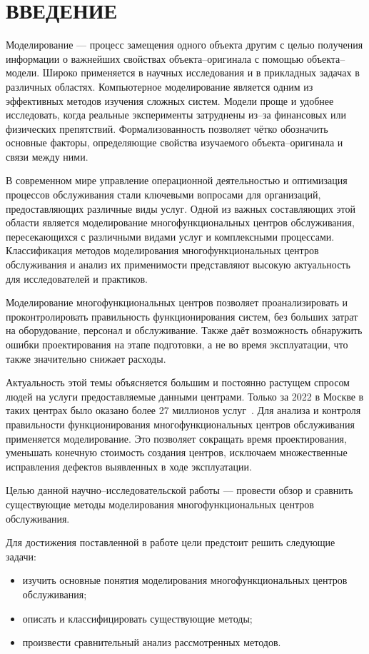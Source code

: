 \chapter*{ВВЕДЕНИЕ}

Моделирование --- процесс замещения одного объекта другим с целью получения информации о важнейших свойствах объекта--оригинала с помощью объекта--модели. Широко применяется в научных исследования и в прикладных задачах в различных областях. Компьютерное моделирование является одним из эффективных методов изучения сложных систем. Модели проще и удобнее исследовать, когда реальные эксперименты затруднены из--за финансовых или физических препятствий. Формализованность позволяет чётко обозначить основные факторы, определяющие свойства изучаемого объекта--оригинала и связи между ними.

В современном мире управление операционной деятельностью и оптимизация процессов обслуживания стали ключевыми вопросами для организаций, предоставляющих различные виды услуг. Одной из важных составляющих этой области является моделирование многофункциональных центров обслуживания, пересекающихся с различными видами услуг и комплексными процессами. Классификация методов моделирования многофункциональных центров обслуживания и анализ их применимости представляют высокую актуальность для исследователей и практиков.

Моделирование многофункциональных центров позволяет проанализировать и проконтролировать правильность функционирования систем, без больших затрат на оборудование, персонал и обслуживание. Также даёт возможность обнаружить ошибки проектирования на этапе подготовки, а не во время эксплуатации, что также значительно снижает расходы.

Актуальность этой темы объясняется большим и постоянно растущем спросом людей на услуги предоставляемые данными центрами. Только за 2022 в Москве в таких центрах было оказано более 27 миллионов услуг~\cite{actual}. Для анализа и контроля правильности функционирования многофункциональных центров обслуживания применяется моделирование. Это позволяет сокращать время проектирования, уменьшать конечную стоимость создания центров, исключаем множественные исправления дефектов выявленных в ходе эксплуатации.

Целью данной научно--исследовательской работы --- провести обзор и сравнить существующие методы моделирования многофункциональных центров обслуживания.

Для достижения поставленной в работе цели предстоит решить следующие задачи:
\begin{itemize}[label=---]
	\item изучить основные понятия моделирования многофункциональных центров обслуживания;
	\item описать и классифицировать существующие методы;
	\item произвести сравнительный анализ рассмотренных методов.
\end{itemize}
